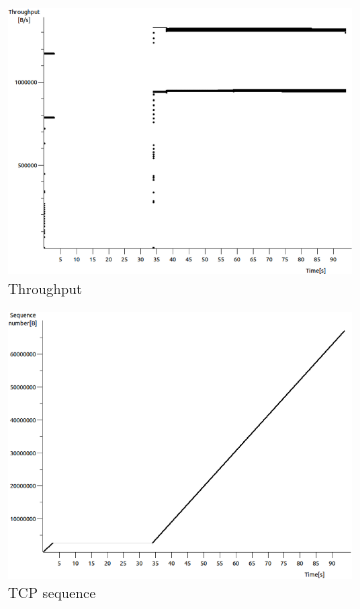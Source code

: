 \documentclass[conference,a4paper]{IEEEtran}
\begin{document}
\begin{figure}
 \centering
 \begin{subfigure}[b]{0.2\textwidth}
  \includegraphics[width=\textwidth]{s3-0_thru}
  \caption{Throughput}
 \end{subfigure}
 \begin{subfigure}[b]{0.2\textwidth}
  \includegraphics[width=\textwidth]{s3-0_seq}
  \caption{TCP sequence}
 \end{subfigure}
 \begin{subfigure}[b]{0.2\textwidth}

\end{subfigure}
\end{figure}
\end{document}
